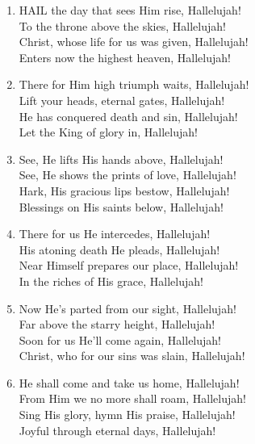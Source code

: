 \begin{enumerate}
    \item HAIL the day that sees Him rise, Hallelujah! \\
        To the throne above the skies, Hallelujah! \\
        Christ, whose life for us was given, Hallelujah! \\
        Enters now the highest heaven, Hallelujah!

    \item There for Him high triumph waits, Hallelujah! \\
        Lift your heads, eternal gates, Hallelujah! \\
        He has conquered death and sin, Hallelujah! \\
        Let the King of glory in, Hallelujah!

    \item See, He lifts His hands above, Hallelujah! \\
        See, He shows the prints of love, Hallelujah! \\
        Hark, His gracious lips bestow, Hallelujah! \\
        Blessings on His saints below, Hallelujah!

    \item There for us He intercedes, Hallelujah! \\
        His atoning death He pleads, Hallelujah! \\
        Near Himself prepares our place, Hallelujah! \\
        In the riches of His grace, Hallelujah!

    \item Now He's parted from our sight, Hallelujah! \\
        Far above the starry height, Hallelujah! \\
        Soon for us He'll come again, Hallelujah! \\
        Christ, who for our sins was slain, Hallelujah!

    \item He shall come and take us home, Hallelujah! \\
        From Him we no more shall roam, Hallelujah! \\
        Sing His glory, hymn His praise, Hallelujah! \\
        Joyful through eternal days, Hallelujah!

\end{enumerate}

